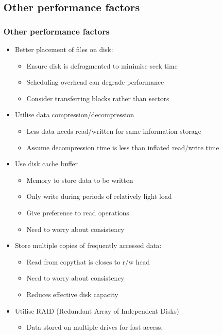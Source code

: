 \documentclass{beamer}
\begin{document}
\subsection{Other performance factors}
\begin{frame}
\frametitle{Other performance factors}
\begin{itemize}
\item Better placement of files on disk:
\begin{itemize}
\item Ensure disk is defragmented to minimise seek time
\item Scheduling overhead can degrade performance
\item Consider transferring blocks rather than sectors
\end{itemize}
\item Utilise data compression/decompression
\begin{itemize}
\item Less data needs read/written for same information storage
\item Assume decompression time is less than inflated read/write time
\end{itemize}
\item Use disk cache buffer
\begin{itemize}
\item Memory to store data to be written
\item Only write during periods of relatively light load
\item Give preference to read operations
\item Need to worry about consistency
\end{itemize}
\item Store multiple copies of frequently accessed data:
\begin{itemize}
\item Read from copythat is closes to r/w head
\item Need to worry about consistency
\item Reduces effective disk capacity
\end{itemize}
\item Utilise RAID (Redundant Array of Independent Disks)
\begin{itemize}
\item Data stored on multiple drives for fast access.
\end{itemize}
\end{itemize}
\end{frame}
\end{document}
